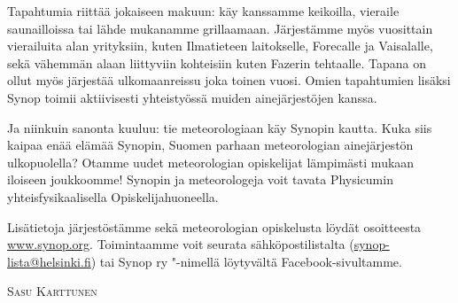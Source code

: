\documentclass[a5paper, 8pt, twocolumn]{book} %
\numberwithin{equation}{section}
\begin{document}
Tapahtumia riittää jokaiseen makuun: käy kanssamme keikoilla, vieraile saunailloissa tai lähde mukanamme grillaamaan. Järjestämme myös vuosittain vierailuita alan yrityksiin, kuten Ilmatieteen laitokselle, Forecalle ja Vaisalalle, sekä vähemmän alaan liittyviin kohteisiin kuten Fazerin tehtaalle. Tapana on ollut myös järjestää ulkomaanreissu joka toinen vuosi. Omien tapahtumien lisäksi Synop toimii aktiivisesti yhteistyössä muiden ainejärjestöjen kanssa.

Ja niinkuin sanonta kuuluu: tie meteorologiaan käy Synopin kautta. Kuka siis kaipaa enää elämää Synopin, Suomen parhaan meteorologian ainejärjestön ulkopuolella?  Otamme uudet meteorologian opiskelijat lämpimästi mukaan iloiseen joukkoomme! Synopin ja meteorologeja voit tavata Physicumin yhteisfysikaalisella Opiskelijahuoneella.

Lisätietoja järjestöstämme sekä meteorologian opiskelusta löydät osoitteesta \url{www.synop.org}. Toimintaamme voit seurata sähkö\-posti\-listalta (\url{synop-lista@helsinki.fi}) tai Synop ry "-nimellä löytyvältä Facebook-sivultamme.

\vspace{0.5cm}\noindent\textsc{Sasu Karttunen}\vspace{0.5cm}

\end{document}
